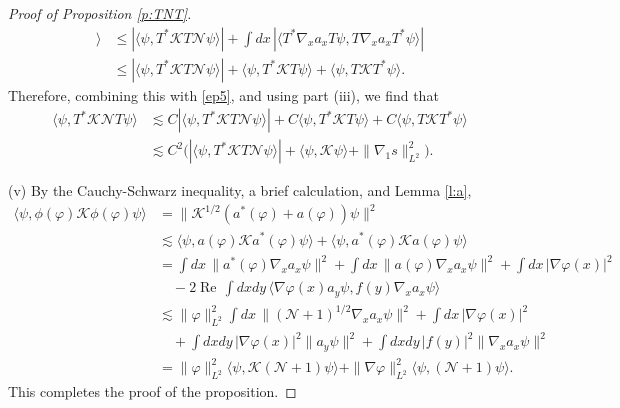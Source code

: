 \documentclass[11pt,a4paper]{scrartcl}
\newcommand{\N}{\mathcal{N}}
\newcommand{\K}{\mathcal{K}}
\renewcommand{\Re}{\operatorname{Re}\,} 	%
\begin{document}
\begin{proof}[Proof of Proposition \ref{p:TNT}]
\begin{align*}
    \rangle & \le |\langle \psi, T^* \K T \N \psi \rangle| + \int dx \,
    |\langle T^* \nabla_x a_x T \psi, T \nabla_x a_x T^* \psi \rangle| \\
    & \le |\langle \psi, T^* \K T \N \psi \rangle| + \langle \psi, T^* \K T
    \psi \rangle + \langle \psi, T \K T^* \psi \rangle.
  \end{align*}
  Therefore, combining this with \eqref{ep5}, and using part (iii), we find
  that
  \begin{align*}
    \langle \psi, T^* \K \N T \psi \rangle & \apprle C |\langle \psi, T^* \K T
    \N \psi \rangle| + C \langle \psi, T^* \K T \psi \rangle + C \langle \psi,
    T \K T^* \psi \rangle \\
    & \apprle C^2 \big( |\langle \psi, T^* \K T \N \psi \rangle| + \langle
    \psi, \K \psi \rangle + \| \nabla_1 s \|_{L^2}^2 \big).
  \end{align*}


  (v) By the Cauchy-Schwarz inequality, a brief calculation, and Lemma
  \ref{l:a},
  \begin{align*}
    \langle \psi, \phi(\varphi) \K \phi(\varphi) \psi \rangle & = \| \K^{1/2}
    (a^*(\varphi) + a(\varphi) ) \psi \|^2 \\
    & \apprle \langle \psi, a(\varphi) \K a^*(\varphi) \psi \rangle + \langle
    \psi, a^*(\varphi) \K a(\varphi) \psi \rangle \\
    & = \int dx \, \| a^*(\varphi) \nabla_x a_x \psi \|^2 + \int dx \, \|
    a(\varphi) \nabla_x a_x \psi \|^2 + \int dx \, |\nabla \varphi(x)|^2 \\
    & \quad - 2 \Re \int dx dy \, \langle \nabla \varphi(x) a_y \psi, f(y)
    \nabla_x a_x \psi \rangle \\
    & \apprle \| \varphi \|_{L^2}^2 \int dx \, \| (\N + 1)^{1/2} \nabla_x a_x
    \psi \|^2 + \int dx \, | \nabla \varphi(x) |^2 \\
    & \quad + \int dx dy \, | \nabla \varphi(x)|^2 \| a_y \psi \|^2 + \int dx
    dy \, |f(y)|^2 \| \nabla_x a_x \psi \|^2 \\
    & = \| \varphi \|_{L^2}^2 \langle \psi, \K (\N + 1) \psi \rangle + \|
    \nabla \varphi \|_{L^2}^2 \langle \psi, (\N + 1) \psi \rangle.
  \end{align*}
  This completes the proof of the proposition.
\end{proof}
\end{document}
